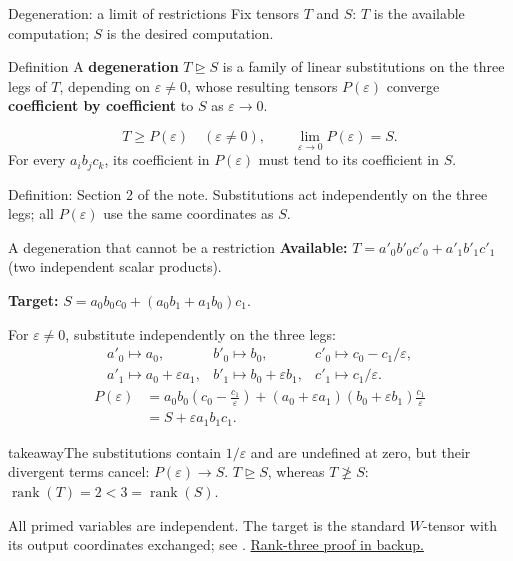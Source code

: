 \documentclass[aspectratio=169,11pt]{beamer}
\newcommand{\rank}{\operatorname{rank}}
\newcommand{\degen}{\unrhd}
\newcommand{\source}[1]{\vfill\par{\fontsize{7.5}{9}\selectfont\color{muted}#1\par}}
\newcommand{\takeaway}[1]{\begin{beamercolorbox}[sep=0.65em,wd=\linewidth]{takeaway}#1\end{beamercolorbox}}
\begin{document}
\begin{frame}{Degeneration: a limit of restrictions}
  Fix tensors $T$ and $S$: $T$ is the available computation;
  $S$ is the desired computation.
  \begin{block}{Definition}
    A \textbf{degeneration} $T\degen S$ is a family of linear substitutions
    on the three legs of $T$, depending on $\varepsilon\ne0$, whose resulting
    tensors $P(\varepsilon)$ converge \textbf{coefficient by coefficient} to $S$
    as $\varepsilon\to0$.
  \end{block}
  \medskip
  \[
    T\ge P(\varepsilon)\quad(\varepsilon\ne0),
    \qquad \lim_{\varepsilon\to0}P(\varepsilon)=S.
  \]
  \medskip
  For every $a_i b_j c_k$, its coefficient in $P(\varepsilon)$ must tend
  to its coefficient in $S$.
  \source{Definition: Section 2 of the note. Substitutions act independently
  on the three legs; all $P(\varepsilon)$ use the same coordinates as $S$.}
\end{frame}

\begin{frame}[label=degeneration-example]{A degeneration that cannot be a restriction}
  \textbf{Available:} $T=a'_0b'_0c'_0+a'_1b'_1c'_1$
  (two independent scalar products).
  \par\smallskip
  \textbf{Target:} $S=a_0b_0c_0+(a_0b_1+a_1b_0)c_1$.
  \par\medskip
  For $\varepsilon\ne0$, substitute independently on the three legs:
  \[
  \begin{array}{lll}
    a'_0\mapsto a_0,& b'_0\mapsto b_0,&
      c'_0\mapsto c_0-c_1/\varepsilon,\\[3pt]
    a'_1\mapsto a_0+\varepsilon a_1,&
      b'_1\mapsto b_0+\varepsilon b_1,&
      c'_1\mapsto c_1/\varepsilon.
  \end{array}
  \]
  \[
  \begin{aligned}
    P(\varepsilon)
      &=a_0b_0\left(c_0-\frac{c_1}{\varepsilon}\right)
        +(a_0+\varepsilon a_1)(b_0+\varepsilon b_1)\frac{c_1}{\varepsilon}\\
      &=S+\varepsilon a_1b_1c_1.
  \end{aligned}
  \]
  \takeaway{The substitutions contain $1/\varepsilon$ and are undefined at zero,
    but their divergent terms cancel: $P(\varepsilon)\to S$.\newline
    $T\degen S$, whereas $T\not\ge S$: $\rank(T)=2<3=\rank(S)$.}
  \source{All primed variables are independent. The target is the standard
  $W$-tensor with its output coordinates exchanged;
  see \cite[proof of Proposition 13, p.~131]{interpolation}.
  \hyperlink{degeneration-rank-proof}{Rank-three proof in backup.}}
\end{frame}
\end{document}
